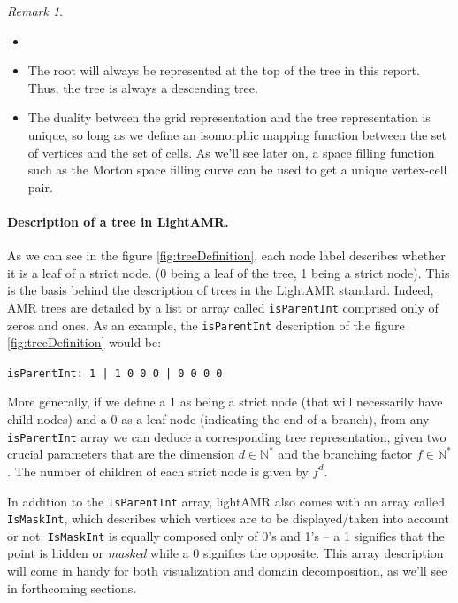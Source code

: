 \documentclass[
	a4paper,
	12pt,
	raggedright,
	twoside
]{tufte-style-article}
\theoremstyle{definition}
\theoremstyle{remark}
\newtheorem*{remark}{Remark}
\begin{document}
\begin{remark}
\begin{itemize}
    \item[]
    \item The root will always be represented at the top of the tree in this report. Thus, the tree is always a descending tree.
    \item The duality between the grid representation and the tree representation is unique, so long as we define an isomorphic mapping function between the set of vertices and the set of cells. As we'll see later on, a space filling function such as the Morton space filling curve can be used to get a unique vertex-cell pair.
\end{itemize}
\end{remark}


\paragraph{Description of a tree in LightAMR.} As we can see in the figure \ref{fig:treeDefinition}, each node label describes whether it is a leaf of a strict node. (0 being a leaf of the tree, 1 being a strict node). This is the basis behind the description of trees in the LightAMR standard. Indeed, \Gls{AMR} trees are detailed by a list or array called \texttt{isParentInt} comprised only of zeros and ones. As an example, the \texttt{isParentInt} description of the figure \ref{fig:treeDefinition} would be:
\begin{center}
    \texttt{isParentInt: 1 | 1 0 0 0 | 0 0 0 0}
\end{center}

More generally, if we define a 1 as being a strict node (that will necessarily have child nodes) and a 0 as a leaf node (indicating the end of a branch), from any \texttt{isParentInt} array we can deduce a corresponding tree representation, given two crucial parameters that are the dimension $d\in \mathbb{N^*}$ and the branching factor $f \in \mathbb{N^*}$. The number of children of each strict node is given by $f^d$.

In addition to the \texttt{IsParentInt} array, lightAMR also comes with an array called \texttt{IsMaskInt}, which describes which vertices are to be displayed/taken into account or not. \texttt{IsMaskInt} is equally composed only of 0's and 1's -- a 1 signifies that the point is hidden or \textit{masked} while a 0 signifies the opposite. This array description will come in handy for both visualization and domain decomposition, as we'll see in forthcoming sections.
\end{document}
